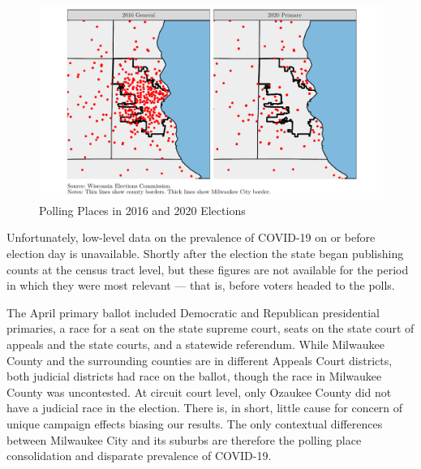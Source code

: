 \documentclass[
  12pt,
]{article}
\begin{document}
\begin{figure}
\centering
\includegraphics{mke_turnout-revised_files/figure-latex/map-1.pdf}
\caption{\label{fig:map}\label{fig:map}Polling Places in 2016 and 2020 Elections}
\end{figure}

Unfortunately, low-level data on the prevalence of COVID-19 on or before election day is unavailable. Shortly after the election the state began publishing counts at the census tract level, but these figures are not available for the period in which they were most relevant --- that is, before voters headed to the polls.

The April primary ballot included Democratic and Republican presidential primaries, a race for a seat on the state supreme court, seats on the state court of appeals and the state courts, and a statewide referendum. While Milwaukee County and the surrounding counties are in different Appeals Court districts, both judicial districts had race on the ballot, though the race in Milwaukee County was uncontested. At circuit court level, only Ozaukee County did not have a judicial race in the election. There is, in short, little cause for concern of unique campaign effects biasing our results. The only contextual differences between Milwaukee City and its suburbs are therefore the polling place consolidation and disparate prevalence of COVID-19.
\end{document}
